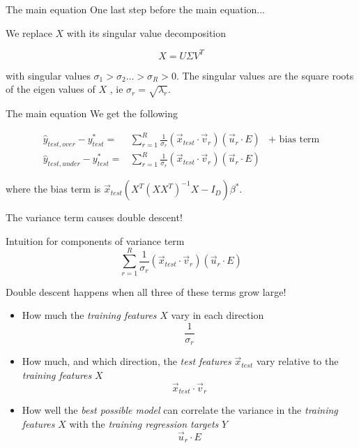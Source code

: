 \documentclass{beamer}
\begin{document}
\begin{frame}{The main equation}
    One last step before the main equation...

    \hspace{5cm}
    \pause

    We replace $X$ with its singular value decomposition

    $$X = U \Sigma V^T$$

    with singular values $\sigma_1 > \sigma_2 \dots > \sigma_R > 0.$ The singular values are the square roots of the eigen values of $X$ , ie $\sigma_r=\sqrt{\lambda_r}.$
\end{frame}

\begin{frame}{The main equation}
    We get the following

    \begin{eqnarray*}
        \hat{y}_{test,over} - y^*_{test} = & \sum_{r=1}^R \frac{1}{\sigma_r}(\vec{x}_{test} \cdot \vec{v}_r)(\vec{u}_r \cdot E) & + \text{ bias term}\\
        \hat{y}_{test,under}- y^*_{test} = & \sum_{r=1}^R \frac{1}{\sigma_r}(\vec{x}_{test} \cdot \vec{v}_r)(\vec{u}_r \cdot E) &
    \end{eqnarray*}

    where the bias term is $\vec{x}_{test} (X^T (XX^T)^{-1}X-I_D)\beta^*$.

    \hfill
    \pause

    The variance term causes double descent!

\end{frame}

\begin{frame}{Intuition for components of variance term}
    \begin{equation}
        \sum_{r=1}^R \frac{1}{\sigma_r}(\vec{x}_{test} \cdot \vec{v}_r)(\vec{u}_r \cdot E)
    \end{equation}
    
    Double descent happens when all three of these terms grow large!
    
    \begin{itemize}
        \item How much the \emph{training features} $X$ vary in each direction
            $$\frac{1}{\sigma_r}$$
        \pause
        \item How much, and which direction, the \emph{test features} $\vec{x}_{test}$ vary relative to the \emph{training features} $X$
        $$\vec{x}_{test} \cdot \vec{v}_r$$
        \pause
        \item How well the \emph{best possible model} can correlate the variance in the \emph{training features} $X$ with the \emph{training regression targets} $Y$
            $$\vec{u}_r \cdot E$$
    \end{itemize}

\end{frame}
\end{document}
